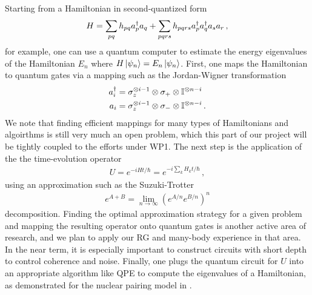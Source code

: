 \documentclass[11pt]{article}
\newcommand{\dagg}[1]{\ensuremath #1^\dag}
\begin{document}
Starting from a Hamiltonian in second-quantized form
\begin{align}
H=\sum_{pq}h_{pq}\dagg{a_p}a_q+\sum_{pqrs}h_{pqrs}\dagg{a_p}\dagg{a_q}a_sa_r\,,
\end{align}
for example, one can use a quantum computer to estimate the energy eigenvalues of the Hamiltonian $E_n$ where $H\ket{\psi_n}=E_n\ket{\psi_n}$. First, one maps the Hamiltonian to quantum gates via a mapping such as the Jordan-Wigner transformation
\begin{align}
\dagg{a_i}&=\sigma_z^{\otimes i-1}\otimes\sigma_+\otimes\mathbb{I}^{\otimes n-i} \\
\nonumber
a_i&=\sigma_z^{\otimes i-1}\otimes\sigma_-\otimes\mathbb{I}^{\otimes n-i}\,.
\end{align}
We note that finding efficient mappings for many types of Hamiltonians and algoirthms is still very much an open problem, which this part of our project will be tightly coupled to the efforts under WP1.
The next step is the application of the the time-evolution operator
\begin{align}
U=e^{-iHt/\hbar}=e^{-i\sum_kH_kt/\hbar}\,,
\end{align}
using an approximation such as the Suzuki-Trotter
\begin{align}
e^{A+B}=\lim_{n\to\infty}\left(e^{A/n}e^{B/n}\right)^n
\end{align}
decomposition. Finding the optimal approximation strategy for a given problem and mapping the resulting operator onto quantum gates is another active area of research, and we plan to apply our RG and many-body experience in that area. In the near term, it is especially important to construct circuits with short depth to control coherence and noise.
Finally, one plugs the quantum circuit for $U$ into an appropriate algorithm like QPE to compute the eigenvalues of a Hamiltonian, as demonstrated for the nuclear pairing model in \cite{ovrum2007}. 
\end{document}
